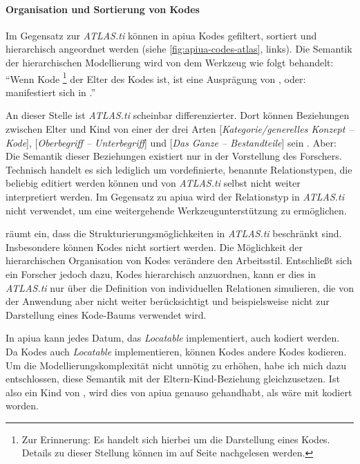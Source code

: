 \paragraph{Organisation und Sortierung von Kodes}
Im Gegensatz zur \textit{ATLAS.ti} können in \gls{apiua} Kodes gefiltert, sortiert und hierarchisch angeordnet werden (siehe \autoref{fig:apiua-codes-atlas}, links). Die Semantik der hierarchischen Modellierung wird von dem Werkzeug wie folgt behandelt: ``Wenn Kode \footnote{Zur Erinnerung: Es handelt sich hierbei um die Darstellung eines Kodes. Details zu dieser Stellung können im  auf Seite \pageref{sec:notationen} nachgelesen werden.} der Elter des Kodes  ist, ist  eine Ausprägung von , oder:  manifestiert sich in .''

An dieser Stelle ist \textit{ATLAS.ti} scheinbar differenzierter. Dort können Beziehungen zwischen Elter und Kind von einer der drei Arten [\textit{Kategorie/generelles Konzept -- Kode}], [\textit{Oberbegriff -- Unterbegriff}] und [\textit{Das Ganze -- Bestandteile}] sein \citep{MuhlmeyerMentzel:2011vs}. Aber: Die Semantik dieser Beziehungen existiert nur in der Vorstellung des Forschers. Technisch handelt es sich lediglich um vordefinierte, benannte Relationstypen, die beliebig editiert werden können und von \textit{ATLAS.ti} selbst nicht weiter interpretiert werden. Im Gegensatz zu \gls{apiua} wird der Relationstyp in \textit{ATLAS.ti} nicht verwendet, um eine weitergehende Werkzeugunterstützung zu ermöglichen.

\cite{MuhlmeyerMentzel:2011vs} räumt ein, dass die Strukturierungsmöglichkeiten in \textit{ATLAS.ti} beschränkt sind. Insbesondere können Kodes nicht sortiert werden. Die Möglichkeit der hierarchischen Organisation von Kodes verändere den Arbeitsstil. Entschließt sich ein Forscher jedoch dazu, Kodes hierarchisch anzuordnen, kann er dies in \textit{ATLAS.ti} nur über die Definition von individuellen Relationen simulieren, die von der Anwendung aber nicht weiter berücksichtigt und beispielsweise nicht zur Darstellung eines Kode-Baums verwendet wird.

In \gls{apiua} kann jedes Datum, das \textit{Locatable} implementiert, auch kodiert werden. Da Kodes auch \textit{Locatable} implementieren, können Kodes andere Kodes kodieren. Um die Modellierungskomplexität nicht unnötig zu erhöhen, habe ich mich dazu entschlossen, diese Semantik mit der Eltern-Kind-Beziehung gleichzusetzen. Ist also  ein Kind von , wird dies von \gls{apiua} genauso gehandhabt, als wäre  mit  kodiert worden.


